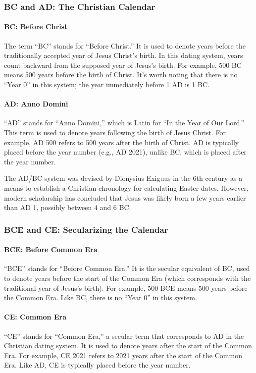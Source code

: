 \documentclass[a4paper,12pt]{book}
\begin{document}
\subsubsection*{BC and AD: The Christian Calendar}
\paragraph{BC: Before Christ}
The term ``BC'' stands for ``Before Christ.'' It is used to denote years before the traditionally accepted year of Jesus Christ’s birth. In this dating system, years count backward from the supposed year of Jesus’s birth. For example, 500 BC means 500 years before the birth of Christ. It’s worth noting that there is no ``Year 0'' in this system; the year immediately before 1 AD is 1 BC.

\paragraph{AD: Anno Domini}
``AD'' stands for ``Anno Domini,'' which is Latin for ``In the Year of Our Lord.'' This term is used to denote years following the birth of Jesus Christ. For example, AD 500 refers to 500 years after the birth of Christ. AD is typically placed before the year number (e.g., AD 2021), unlike BC, which is placed after the year number.

The AD/BC system was devised by Dionysius Exiguus in the 6th century as a means to establish a Christian chronology for calculating Easter dates. However, modern scholarship has concluded that Jesus was likely born a few years earlier than AD 1, possibly between 4 and 6 BC.

\subsubsection*{BCE and CE: Secularizing the Calendar}
\paragraph{BCE: Before Common Era}
``BCE'' stands for ``Before Common Era.'' It is the secular equivalent of BC, used to denote years before the start of the Common Era (which corresponds with the traditional year of Jesus’s birth). For example, 500 BCE means 500 years before the Common Era. Like BC, there is no ``Year 0'' in this system.

\paragraph{CE: Common Era}
``CE'' stands for ``Common Era,'' a secular term that corresponds to AD in the Christian dating system. It is used to denote years after the start of the Common Era. For example, CE 2021 refers to 2021 years after the start of the Common Era. Like AD, CE is typically placed before the year number.
\end{document}
